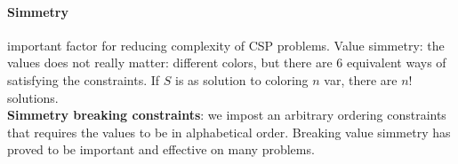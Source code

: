 \documentclass[10pt]{report}
\begin{document}
\paragraph{Simmetry} important factor for reducing complexity of CSP problems. Value simmetry: the values does not really matter: different colors, but there are 6 equivalent ways of satisfying the constraints. If $S$ is as solution to coloring $n$ var, there are $n!$ solutions.\\
\textbf{Simmetry breaking constraints}: we impost an arbitrary ordering constraints that requires the values to be in alphabetical order. Breaking value simmetry has proved to be important and effective on many problems.
\end{document}
